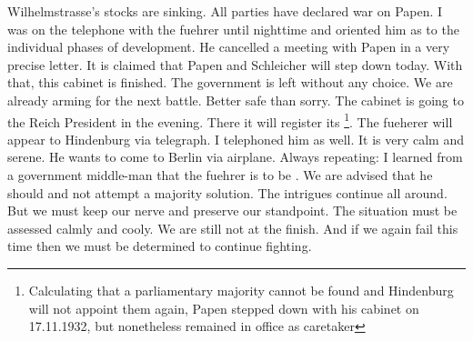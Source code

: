 
Wilhelmstrasse's stocks are sinking. All parties have declared war on Papen. I was on the telephone with the fuehrer until nighttime and oriented him as to the individual phases of development. He cancelled a meeting with Papen in a very precise letter. It is claimed that Papen and Schleicher will step down today. With that, this cabinet is finished. The government is left without any choice. We are already arming for the next battle. Better safe than sorry. The cabinet is going to the Reich President in the evening. There it will register its \footnote{Calculating that a parliamentary majority cannot be found and Hindenburg will not appoint them again, Papen stepped down with his cabinet on 17.11.1932, but nonetheless remained in office as caretaker}. The fueherer will appear to Hindenburg via telegraph. I telephoned him as well. It is very calm and serene. He wants to come to Berlin via airplane. Always repeating:  I learned from a government middle-man that the fuehrer is to be . We are advised that he should  and not attempt a majority solution. The intrigues continue all around. But we must keep our nerve and preserve our standpoint. The situation must be assessed calmly and cooly. We are still not at the finish. And if we again fail this time then we must be determined to continue fighting.

